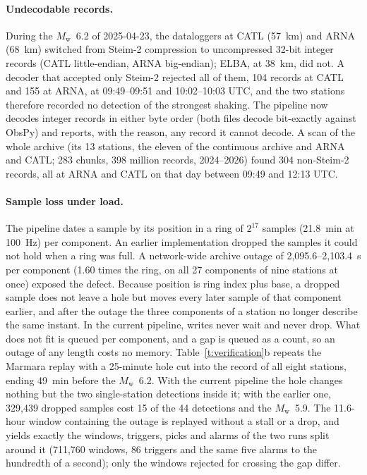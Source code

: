 \documentclass[11pt,a4paper]{article}
\newcommand{\Mw}{$M_\mathrm{w}$}
\begin{document}
\paragraph{Undecodable records.} During the \Mw{}~6.2 of 2025-04-23, the
dataloggers at CATL (57~km) and ARNA (68~km) switched from Steim-2 compression
to uncompressed 32-bit integer records (CATL little-endian, ARNA big-endian);
ELBA, at 38~km, did not. A decoder that accepted only Steim-2 rejected all of them, 104 records at CATL and 155 at ARNA, at 09:49--09:51 and 10:02--10:03 UTC, and the two stations therefore recorded no detection of the strongest shaking. The
pipeline now decodes integer records in either byte order (both files decode
bit-exactly against ObsPy) and reports, with the reason, any record it cannot
decode. A scan of the whole archive (its 13 stations, the eleven of the continuous
archive and ARNA and CATL; 283 chunks, 398 million records, 2024--2026) found 304 non-Steim-2 records, all at ARNA and CATL on
that day between 09:49 and 12:13 UTC.

\paragraph{Sample loss under load.} The pipeline dates a sample by its position
in a ring of $2^{17}$ samples (21.8~min at 100~Hz) per component. An earlier
implementation dropped the samples it could not hold when a ring was full. A
network-wide archive outage of 2{,}095.6--2{,}103.4~s per component (1.60 times the ring, on all 27 components of nine stations at once) exposed the defect. Because position is ring index plus base, a dropped sample does not leave a hole but moves every later sample of that component earlier, and after the outage the three components of a station no longer describe the same instant.
In the current pipeline, writes never wait and never drop. What does not fit is queued per component, and a gap is queued as a count, so an outage of any length costs no memory. Table~\ref{t:verification}b repeats the Marmara replay
with a 25-minute hole cut into the record of all eight stations, ending 49~min
before the \Mw{}~6.2. With the current pipeline the hole changes nothing but
the two single-station detections inside it; with the earlier one, 329{,}439
dropped samples cost 15 of the 44 detections and the \Mw{}~5.9. The 11.6-hour
window containing the outage is replayed without a stall or a drop, and
yields exactly the windows, triggers, picks and alarms of the two runs split
around it (711{,}760 windows, 86 triggers and the same five alarms to the
hundredth of a second); only the windows rejected for crossing the gap differ.
\end{document}
